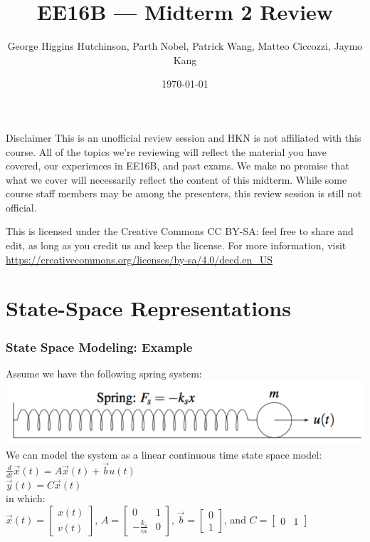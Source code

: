 \documentclass{beamer}
\title{EE16B --- Midterm 2 Review}
\author{George Higgins Hutchinson, Parth Nobel, Patrick Wang, Matteo Ciccozzi, Jaymo Kang}
\institute{Presented by: Vishnu Iyer, George Higgins Hutchinson, Rehan Durrani}
\date{\today}
\begin{document}
	\begin{frame}
		\titlepage
	\end{frame}

	\begin{frame}{Disclaimer}
	This is an unofficial review session and HKN is not affiliated with this course. All of the topics we're reviewing will reflect the material you have covered, our experiences in EE16B, and past exams. We make no promise that what we cover will necessarily reflect the content of this midterm. While some course staff members may be among the presenters, this review session is still not official.
	\vspace{1em}
	
	This is licensed under the Creative Commons CC BY-SA: feel free to share and edit, as long as you credit us and keep the license. For more information, visit \\ \small{\url{https://creativecommons.org/licenses/by-sa/4.0/deed.en_US}}
	
	\end{frame}

\section[State-Space]{State-Space Representations}

\begin{frame}
\frametitle{State Space Modeling: Example}

Assume we have the following spring system: \\
\includegraphics[scale=0.5]{./images/spring.png} \\ \pause
We can model the system as a linear continuous time state space model: \\
$\frac{d}{dt}\vec{x}(t) = A\vec{x}(t) + \vec{b}u(t)$ \\
$\vec{y}(t) = C\vec{x}(t)$ \\
in which: \\
$\vec{x}(t) = 
\begin{bmatrix}
x(t) \\
v(t)
\end{bmatrix}$, 
$A = 
\begin{bmatrix}
0 & 1 \\
-\frac{k_{s}}{m} & 0
\end{bmatrix}$, 
$\vec{b} = 
\begin{bmatrix}
0 \\
1
\end{bmatrix}$, and
$C = 
\begin{bmatrix}
0 & 1
\end{bmatrix}$
\end{frame}
\end{document}
